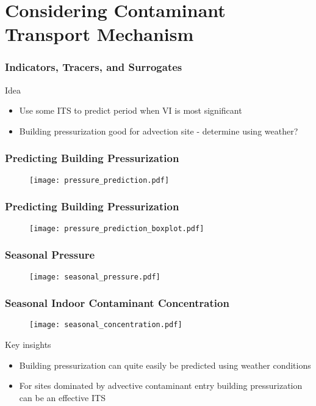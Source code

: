 \section{Considering Contaminant Transport Mechanism}


\begin{frame}
  \frametitle{Indicators, Tracers, and Surrogates}
  \begin{block}{Idea}
    \begin{itemize}
      \item Use some ITS to predict period when VI is most significant
      \item Building pressurization good for advection site - determine using weather?
    \end{itemize}
  \end{block}
\end{frame}


\begin{frame}
  \frametitle{Predicting Building Pressurization}
  \begin{figure}
    \centering
    \texttt{[image: pressure\_prediction.pdf]}
  \end{figure}
\end{frame}

\begin{frame}
  \frametitle{Predicting Building Pressurization}
  \begin{figure}
    \centering
    \texttt{[image: pressure\_prediction\_boxplot.pdf]}
  \end{figure}
\end{frame}

\begin{frame}
  \frametitle{Seasonal Pressure}
  \begin{figure}
    \centering
    \texttt{[image: seasonal\_pressure.pdf]}
  \end{figure}
\end{frame}

\begin{frame}
  \frametitle{Seasonal Indoor Contaminant Concentration}
  \begin{figure}
    \centering
    \texttt{[image: seasonal\_concentration.pdf]}
  \end{figure}
\end{frame}

\begin{frame}
  \begin{alertblock}{Key insights}
    \begin{itemize}
      \item Building pressurization can quite easily be predicted using weather conditions
      \item For sites dominated by advective contaminant entry building pressurization can be an effective ITS
    \end{itemize}
  \end{alertblock}
\end{frame}
